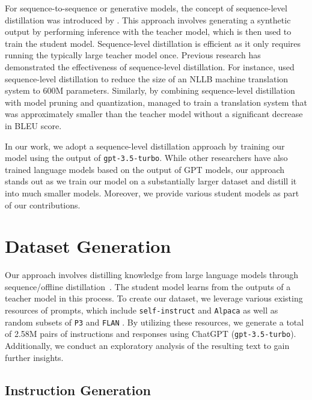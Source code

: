 \documentclass[11pt]{article}
\newcommand{\dataset}[1]{\texttt{#1}\xspace}
\newcommand{\llm}[1]{\texttt{#1}\xspace}
\newcommand{\chatgpt}{\llm{gpt-3.5-turbo}}
\begin{document}
For sequence-to-sequence or generative models, the concept of sequence-level distillation was introduced by \citet{kim-rush-2016-sequence}. This approach involves generating a synthetic output by performing inference with the teacher model, which is then used to train the student model. Sequence-level distillation is efficient as it only requires running the typically large teacher model once. Previous research has demonstrated the effectiveness of sequence-level distillation. For instance, \citet{DBLP:journals/corr/abs-2207-04672} used sequence-level distillation to reduce the size of an NLLB machine translation system to 600M parameters. Similarly, by combining sequence-level distillation with model pruning and quantization, \citet{behnke-etal-2021-efficient, bogoychev-etal-2020-edinburghs} managed to train a translation system that was approximately  smaller than the teacher model without a significant decrease in BLEU score.


In our work, we adopt a sequence-level distillation approach by training our model using the output of \chatgpt. While other researchers have also trained language models based on the output of GPT models, our approach stands out as we train our model on a substantially larger dataset and distill it into much smaller models. Moreover, we provide various student models as part of our contributions. 

\section{Dataset Generation}
\label{sec:dataset}
Our approach involves distilling knowledge from large language models through sequence/offline distillation~\cite{kim-rush-2016-sequence}. The student model learns from the outputs of a teacher model in this process.
To create our dataset, we leverage various existing resources of prompts, which include  \dataset{self-instruct} \cite{DBLP:journals/corr/abs-2212-10560} and \dataset{Alpaca} \cite{alpaca} as well as random subsets of \dataset{P3} \cite{DBLP:conf/iclr/SanhWRBSACSRDBX22} and \dataset{FLAN} \cite{DBLP:journals/corr/abs-2301-13688}. 
By utilizing these resources, we generate a total of 2.58M pairs of instructions and responses using ChatGPT (\chatgpt).
Additionally, we conduct an exploratory analysis of the resulting text to gain further insights.


\subsection{Instruction Generation}
\end{document}

